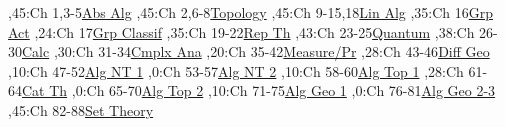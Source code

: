 
\bgroup
\renewcommand{\href}[1]{} %
\hypersetup{linkcolor=black} %
\renewcommand{\solidwidth}{0.7pt}
\renewcommand{\boldwidth}{1.5pt}

\setcounter{diagheight}{50}
\begin{chart}
,45:{Ch 1,3-5}{\hyperref[part:absalg]{Abs Alg}}{}
,45:{Ch 2,6-8}{\hyperref[part:basictop]{Topology}}{}
,45:{Ch 9-15,18}{\hyperref[part:linalg]{Lin Alg}}{}
,35:{Ch 16}{\hyperref[part:groups]{Grp Act}}{}
,24:{Ch 17}{\hyperref[ch:sylow]{Grp Classif}}{}
,35:{Ch 19-22}{\hyperref[part:repth]{Rep Th}}{}
,43:{Ch 23-25}{\hyperref[part:quantum]{Quantum}}{}
,38:{Ch 26-30}{\hyperref[part:calc]{Calc}}{}
,30:{Ch 31-34}{\hyperref[part:cmplxana]{Cmplx Ana}}{}
,20:{Ch 35-42}{\hyperref[part:measure]{Measure/Pr}}{}
,28:{Ch 43-46}{\hyperref[part:diffgeo]{Diff Geo}}{}
,10:{Ch 47-52}{\hyperref[part:algnt1]{Alg NT 1}}{}
,0:{Ch 53-57}{\hyperref[part:algnt2]{Alg NT 2}}{}
,10:{Ch 58-60}{\hyperref[part:algtop1]{Alg Top 1}}{}
,28:{Ch 61-64}{\hyperref[part:cats]{Cat Th}}{}
,0:{Ch 65-70}{\hyperref[part:algtop2]{Alg Top 2}}{}
,10:{Ch 71-75}{\hyperref[part:ag1]{Alg Geo 1}}{}
,0:{Ch 76-81}{\hyperref[part:ag2]{Alg Geo 2-3}}{}
,45:{Ch 82-88}{\hyperref[part:st1]{Set Theory}}{}


\end{chart}
